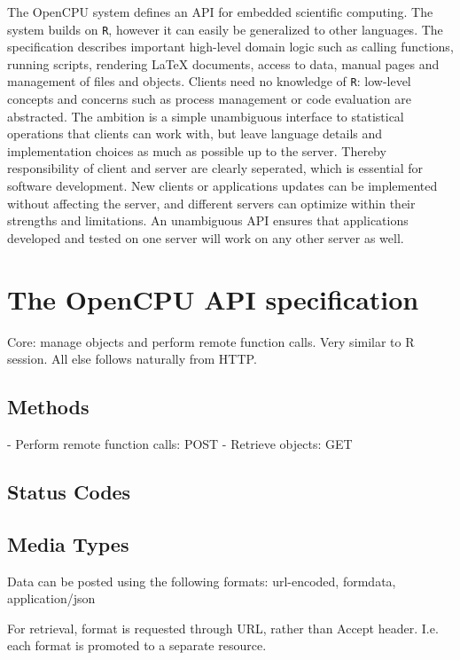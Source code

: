\documentclass{article}
\newcommand{\R}{\texttt{R}\xspace}
\begin{document}
The OpenCPU system defines an API for embedded scientific computing. The system builds on \R, however it can easily be generalized to other languages. The specification describes important high-level domain logic such as calling functions, running scripts, rendering \LaTeX \xspace documents, access to data, manual pages and  management of files and objects. Clients need no knowledge of \R: low-level concepts and concerns such as process management or code evaluation are abstracted. The ambition is a simple unambiguous interface to statistical operations that clients can work with, but leave language details and implementation choices as much as possible up to the server. Thereby responsibility of client and server are clearly seperated, which is essential for software development. New clients or applications updates can be implemented without affecting the server, and different servers can optimize within their strengths and limitations. An unambiguous API ensures that applications developed and tested on one server will work on any other server as well. 







\section{The OpenCPU API specification}

Core: manage objects and perform remote function calls. Very similar to R session.
All else follows naturally from HTTP.

\subsection{Methods}

- Perform remote function calls: POST
- Retrieve objects: GET

\subsection{Status Codes}

\subsection{Media Types}

Data can be posted using the following formats:
url-encoded, formdata, application/json

For retrieval, format is requested through URL, rather than Accept header.
I.e. each format is promoted to a separate resource. 
\end{document}
